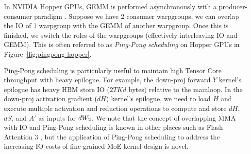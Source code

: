 In NVIDIA Hopper GPUs, GEMM is performed asynchronously with a producer-consumer paradigm \citep{shah2024flashattention3fastaccurateattention}. Suppose we have 2 consumer warpgroups, we can overlap the IO of 1 warpgroup with the GEMM of another warpgroup. Once this is finished, we switch the roles of the warpgroups (effectively interleaving IO and GEMM). This is often referred to as \textit{Ping-Pong scheduling} \citep{wright2024cutlass,shah2024flashattention3fastaccurateattention} on Hopper GPUs in Figure~\ref{fig:pingpong-hopper}. 
    
    



Ping-Pong scheduling is particularly useful to maintain high Tensor Core throughput with heavy epilogue. For example, the down-proj forward $Y$ kernel's epilogue has heavy HBM store IO ($2TKd$ bytes) relative to the mainloop. In the down-proj activation gradient ($dH$) kernel's epilogue, we need to load $H$ and execute multiple activation and reduction operations to compute and store $dH$, $dS$, and $A'$ as inputs for $dW_{2}$. We note that the concept of overlapping MMA with IO and Ping-Pong scheduling is known in other places such as Flash Attention 3 \citep{shah2024flashattention3fastaccurateattention}, but the application of Ping-Pong scheduling to address the increasing IO costs of fine-grained MoE kernel design is novel.


